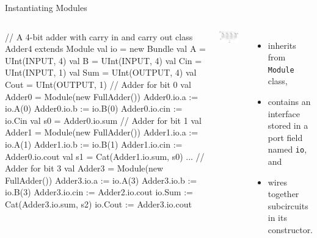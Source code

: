 \documentclass[xcolor=pdflatex,dvipsnames,table]{beamer}
\begin{document}
\begin{frame}[fragile]{Instantiating Modules}

\begin{columns}


{
\begin{scala}
// A 4-bit adder with carry in and carry out
class Adder4 extends Module {
  val io = new Bundle {
    val A    = UInt(INPUT, 4)
    val B    = UInt(INPUT, 4)
    val Cin  = UInt(INPUT, 1)
    val Sum  = UInt(OUTPUT, 4)
    val Cout = UInt(OUTPUT, 1)
  }
  // Adder for bit 0
  val Adder0 = Module(new FullAdder())
  Adder0.io.a   := io.A(0)
  Adder0.io.b   := io.B(0)
  Adder0.io.cin := io.Cin
  val s0 = Adder0.io.sum
  // Adder for bit 1
  val Adder1 = Module(new FullAdder())
  Adder1.io.a   := io.A(1)
  Adder1.io.b   := io.B(1)
  Adder1.io.cin := Adder0.io.cout
  val s1 = Cat(Adder1.io.sum, s0)
  ...
  // Adder for bit 3
  val Adder3 = Module(new FullAdder())
  Adder3.io.a   := io.A(3)
  Adder3.io.b   := io.B(3)
  Adder3.io.cin := Adder2.io.cout
  io.Sum  := Cat(Adder3.io.sum, s2)
  io.Cout := Adder3.io.cout
}
\end{scala}
}


\begin{center}
\includegraphics[width=0.9\textwidth]{../getting-started/figs/4_Bit_Adder.jpg}
\end{center}

\begin{itemize}
\item inherits from \verb+Module+ class,
\item contains an interface stored in a port field named \verb+io+, and
\item wires together subcircuits in its constructor.
\end{itemize}

\end{columns}

\end{frame}
\end{document}
